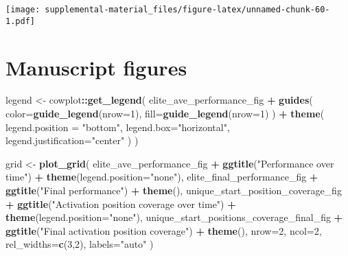 \documentclass[]{book}
\newenvironment{Shaded}{\begin{snugshade}}{\end{snugshade}}
\newcommand{\DataTypeTok}[1]{\textcolor[rgb]{0.13,0.29,0.53}{#1}}
\newcommand{\DecValTok}[1]{\textcolor[rgb]{0.00,0.00,0.81}{#1}}
\newcommand{\KeywordTok}[1]{\textcolor[rgb]{0.13,0.29,0.53}{\textbf{#1}}}
\newcommand{\NormalTok}[1]{#1}
\newcommand{\OperatorTok}[1]{\textcolor[rgb]{0.81,0.36,0.00}{\textbf{#1}}}
\newcommand{\StringTok}[1]{\textcolor[rgb]{0.31,0.60,0.02}{#1}}
\begin{document}
\texttt{[image: supplemental-material\_files/figure-latex/unnamed-chunk-60-1.pdf]}

\hypertarget{manuscript-figures-5}{%
\section{Manuscript figures}\label{manuscript-figures-5}}

\begin{Shaded}
\begin{Highlighting}[]
\NormalTok{legend <-}\StringTok{ }\NormalTok{cowplot}\OperatorTok{::}\KeywordTok{get_legend}\NormalTok{(}
\NormalTok{    elite_ave_performance_fig }\OperatorTok{+}
\StringTok{      }\KeywordTok{guides}\NormalTok{(}
        \DataTypeTok{color=}\KeywordTok{guide_legend}\NormalTok{(}\DataTypeTok{nrow=}\DecValTok{1}\NormalTok{),}
        \DataTypeTok{fill=}\KeywordTok{guide_legend}\NormalTok{(}\DataTypeTok{nrow=}\DecValTok{1}\NormalTok{)}
\NormalTok{      ) }\OperatorTok{+}
\StringTok{      }\KeywordTok{theme}\NormalTok{(}
        \DataTypeTok{legend.position =} \StringTok{"bottom"}\NormalTok{,}
        \DataTypeTok{legend.box=}\StringTok{"horizontal"}\NormalTok{,}
        \DataTypeTok{legend.justification=}\StringTok{"center"}
\NormalTok{      )}
\NormalTok{  )}

\NormalTok{grid <-}\StringTok{ }\KeywordTok{plot_grid}\NormalTok{(}
\NormalTok{  elite_ave_performance_fig }\OperatorTok{+}
\StringTok{    }\KeywordTok{ggtitle}\NormalTok{(}\StringTok{"Performance over time"}\NormalTok{) }\OperatorTok{+}
\StringTok{    }\KeywordTok{theme}\NormalTok{(}\DataTypeTok{legend.position=}\StringTok{"none"}\NormalTok{),}
\NormalTok{  elite_final_performance_fig }\OperatorTok{+}
\StringTok{    }\KeywordTok{ggtitle}\NormalTok{(}\StringTok{"Final performance"}\NormalTok{) }\OperatorTok{+}
\StringTok{    }\KeywordTok{theme}\NormalTok{(),}
\NormalTok{  unique_start_position_coverage_fig }\OperatorTok{+}
\StringTok{    }\KeywordTok{ggtitle}\NormalTok{(}\StringTok{"Activation position coverage over time"}\NormalTok{) }\OperatorTok{+}
\StringTok{    }\KeywordTok{theme}\NormalTok{(}\DataTypeTok{legend.position=}\StringTok{"none"}\NormalTok{),}
\NormalTok{  unique_start_positions_coverage_final_fig }\OperatorTok{+}
\StringTok{    }\KeywordTok{ggtitle}\NormalTok{(}\StringTok{"Final activation position coverage"}\NormalTok{) }\OperatorTok{+}
\StringTok{    }\KeywordTok{theme}\NormalTok{(),}
  \DataTypeTok{nrow=}\DecValTok{2}\NormalTok{,}
  \DataTypeTok{ncol=}\DecValTok{2}\NormalTok{,}
  \DataTypeTok{rel_widths=}\KeywordTok{c}\NormalTok{(}\DecValTok{3}\NormalTok{,}\DecValTok{2}\NormalTok{),}
  \DataTypeTok{labels=}\StringTok{"auto"}
\NormalTok{)}


\end{Highlighting}
\end{Shaded}
\end{document}
